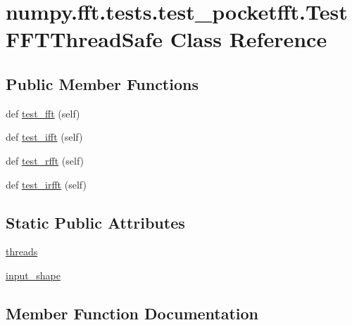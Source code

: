 \hypertarget{classnumpy_1_1fft_1_1tests_1_1test__pocketfft_1_1TestFFTThreadSafe}{}\section{numpy.\+fft.\+tests.\+test\+\_\+pocketfft.\+Test\+F\+F\+T\+Thread\+Safe Class Reference}
\label{classnumpy_1_1fft_1_1tests_1_1test__pocketfft_1_1TestFFTThreadSafe}
\subsection*{Public Member Functions}
\begin{DoxyCompactItemize}
\item 
def \hyperlink{classnumpy_1_1fft_1_1tests_1_1test__pocketfft_1_1TestFFTThreadSafe_a25051be397591c0d9df1656638e8d0e8}{test\+\_\+fft} (self)
\item 
def \hyperlink{classnumpy_1_1fft_1_1tests_1_1test__pocketfft_1_1TestFFTThreadSafe_aa1876b73e9bc1fc017569bf44a7fbc59}{test\+\_\+ifft} (self)
\item 
def \hyperlink{classnumpy_1_1fft_1_1tests_1_1test__pocketfft_1_1TestFFTThreadSafe_a3afadc535a47da3b31496b3e38bd791e}{test\+\_\+rfft} (self)
\item 
def \hyperlink{classnumpy_1_1fft_1_1tests_1_1test__pocketfft_1_1TestFFTThreadSafe_a26148a9f58747767f77cfd2aea5582c1}{test\+\_\+irfft} (self)
\end{DoxyCompactItemize}
\subsection*{Static Public Attributes}
\begin{DoxyCompactItemize}
\item 
\hyperlink{classnumpy_1_1fft_1_1tests_1_1test__pocketfft_1_1TestFFTThreadSafe_a9d75e627c4dd5b14f759c9be026c85ac}{threads}
\item 
\hyperlink{classnumpy_1_1fft_1_1tests_1_1test__pocketfft_1_1TestFFTThreadSafe_a1dc716d41ebbe40f74a4500a04190ce5}{input\+\_\+shape}
\end{DoxyCompactItemize}


\subsection{Member Function Documentation}
\mbox{\label{classnumpy_1_1fft_1_1tests_1_1test__pocketfft_1_1TestFFTThreadSafe_a25051be397591c0d9df1656638e8d0e8}} 
